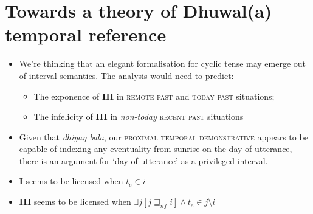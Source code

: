 \documentclass[11pt,dvipsnames]{article}
\begin{document}
\section*{Towards a theory of Dhuwal(a) temporal reference}
\begin{itemize}
\item We're thinking that an elegant formalisation for cyclic tense may emerge out of interval semantics. The analysis would need to predict:

\begin{itemize}
\item The exponence of \textbf{III} in \textsc{remote past} and \textsc{today past} situations;
\item The infelicity of \textbf{III} in \textit{non-today} \textsc{recent past} situations
\end{itemize}

\item Given that \textit{dhiyaŋ bala}, our \textsc{proximal temporal demonstrative} appears to be capable of indexing any eventuality from sunrise on the day of utterance, there is an argument for `day of utterance' as a privileged interval.

\item \textbf{I} seems to be licensed when $ t_e \in i $
\item \textbf{III} seems to be licensed when $\exists j[j\sqsupseteq_{nf} i] \wedge t_e \in  j\setminus i$

\end{itemize}
\end{document}

